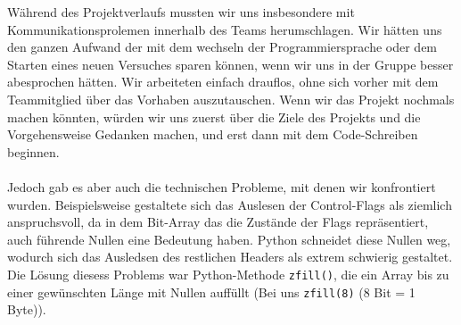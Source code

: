 \documentclass{article} %
\begin{document}
Während des Projektverlaufs mussten wir uns insbesondere mit Kommunikationsprolemen innerhalb des Teams herumschlagen. Wir hätten uns den ganzen Aufwand der mit dem wechseln der Programmiersprache oder dem Starten eines neuen Versuches sparen können, wenn wir uns in der Gruppe besser abesprochen hätten. Wir arbeiteten einfach drauflos, ohne sich vorher mit dem Teammitglied über das Vorhaben auszutauschen. Wenn wir das Projekt nochmals machen könnten, würden wir uns zuerst über die Ziele des Projekts und die Vorgehensweise Gedanken machen, und erst dann mit dem Code-Schreiben beginnen.\\
\\
Jedoch gab es aber auch die technischen Probleme, mit denen wir konfrontiert wurden. Beispielsweise gestaltete sich das Auslesen der Control-Flags als ziemlich anspruchsvoll, da in dem Bit-Array das die Zustände der Flags repräsentiert, auch führende Nullen eine Bedeutung haben. Python schneidet diese Nullen weg, wodurch sich das Ausledsen des restlichen Headers als extrem schwierig gestaltet. Die Lösung diesess Problems war Python-Methode \texttt{zfill()}, die ein Array bis zu einer gewünschten Länge mit Nullen auffüllt (Bei uns \texttt{zfill(8)} (8 Bit = 1 Byte)).

\newpage
\end{document}
